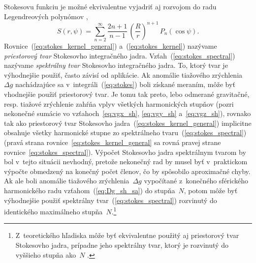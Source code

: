 \documentclass[a4paper, 12pt]{book}
\begin{document}
Stokesovu funkciu je možné ekvivalentne vyjadriť aj rozvojom do radu 
Legendreových polynómov \parencite{MoritzPhysicalGeodesy},
%
\begin{equation}
\label{eq:stokes_spectral}
S(r, \psi) = \sum_{n = 2}^{\infty} \frac{2n + 1}{n - 1} \, \left( \frac{R}{r} 
\right)^{n + 1} \, P_n(\cos\psi){.}
\end{equation}
%
Rovnice~(\ref{eq:stokes_kernel_general}) a~(\ref{eq:stokes_kernel}) nazývame 
\emph{priestorový tvar} Stokesovho integračného jadra.  
Vzťah~(\ref{eq:stokes_spectral}) nazývame \emph{spektrálny tvar} Stokesovho 
integračného jadra.  To, ktorý tvar je výhodnejšie použiť, často závisí od 
aplikácie.  Ak anomálie tiažového zrýchlenia~$\Delta g$ nachádzajúce sa 
v~integráli~(\ref{eq:stokes}) boli získané meraním, môže byť vhodnejšie použiť 
priestorový tvar.  Je tomu tak preto, lebo odmerané gravitačné, resp. tiažové 
zrýchlenie zahŕňa vplyv všetkých harmonických stupňov (pozri nekonečné sumácie 
vo vzťahoch~\ref{eq:vgx_sh}, \ref{eq:vgy_sh} a~\ref{eq:vgz_sh}), rovnako tak 
ako priestorový tvar Stokesovho jadra~(\ref{eq:stokes_kernel_general}) 
implicitne obsahuje všetky harmonické stupne zo spektrálneho 
tvaru~(\ref{eq:stokes_spectral}) (pravá strana 
rovnice~\ref{eq:stokes_kernel_general} sa rovná pravej strane 
rovnice~\ref{eq:stokes_spectral}).  Výpočet Stokesovho jadra spektrálnym tvarom 
by bol v~tejto situácii nevhodný, pretože nekonečný rad by musel byť 
v~praktickom výpočte obmedzený na konečný počet členov, čo by spôsobilo 
aproximačné chyby.  Ak ale boli anomálie tiažového zrýchlenia~$\Delta g$ 
vypočítané z~konečného sférického harmonického radu vzťahom~(\ref{eq:Dg_sh_sa}) 
do stupňa~$N$, potom môže byť výhodnejšie použiť spektrálny 
tvar~(\ref{eq:stokes_spectral}) rozvinutý do identického maximálneho 
stupňa~$N$.\footnote{Z~teoretického hľadiska môže byť ekvivalentne použitý aj 
priestorový tvar Stokesovho jadra, prípadne jeho spektrálny tvar, ktorý je 
rozvinutý do vyššieho stupňa ako~$N$ \parencite[pozri 
napríklad][]{Freeden2009}.}
\end{document}

